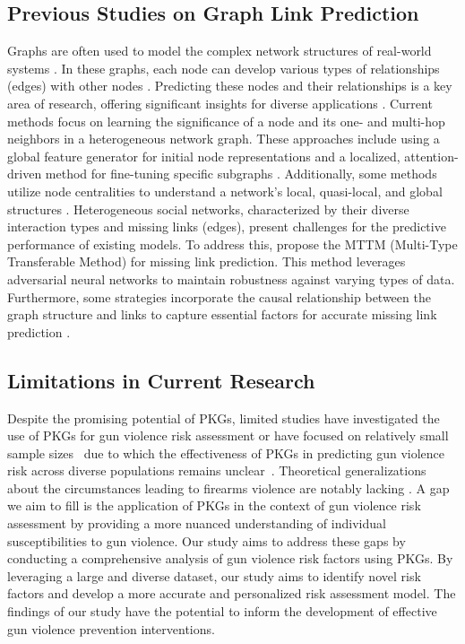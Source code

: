 \documentclass[11pt]{article}
\begin{document}
\subsection{Previous Studies on Graph Link Prediction}
Graphs are often used to model the complex network structures of real-world systems \cite{kazemi2018simple,ding2022data}. In these graphs, each node can develop various types of relationships (edges) with other nodes \cite{nasiri2022impact}. Predicting these nodes and their relationships is a key area of research, offering significant insights for diverse applications \cite{cen2019representation,kumar2022link,wang2021self,10004751}. Current methods focus on learning the significance of a node and its one- and multi-hop neighbors in a heterogeneous network graph. These approaches include using a global feature generator for initial node representations \cite{cen2019representation, kumar2022link} and a localized, attention-driven method for fine-tuning specific subgraphs \cite{wang2021self}. Additionally, some methods utilize node centralities to understand a network’s local, quasi-local, and global structures \cite{kumar2022link}. Heterogeneous social networks, characterized by their diverse interaction types and missing links (edges), present challenges for the predictive performance of existing models. To address this, \cite{10004751} propose the MTTM (Multi-Type Transferable Method) for missing link prediction. This method leverages adversarial neural networks to maintain robustness against varying types of data. Furthermore, some strategies incorporate the causal relationship between the graph structure and links to capture essential factors for accurate missing link prediction \cite{zhao2022learning}.

\subsection{Limitations in Current Research}
Despite the promising potential of PKGs, limited studies have investigated the use of PKGs for gun violence risk assessment or have focused on relatively small sample sizes~\cite{Fazel} due to which the effectiveness of PKGs in predicting gun violence risk across diverse populations remains unclear~\cite{Fazel}. Theoretical generalizations about the circumstances leading to firearms violence are notably lacking \cite{nij2021gaps}. A gap we aim to fill is the application of PKGs in the context of gun violence risk assessment by providing a more nuanced understanding of individual susceptibilities to gun violence. Our study aims to address these gaps by conducting a comprehensive analysis of gun violence risk factors using PKGs. By leveraging a large and diverse dataset, our study aims to identify novel risk factors and develop a more accurate and personalized risk assessment model. The findings of our study have the potential to inform the development of effective gun violence prevention interventions.
\end{document}
